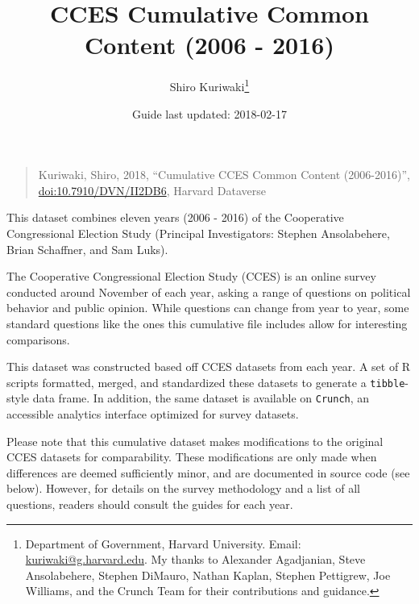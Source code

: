 \documentclass[10pt,article,oneside]{memoir}
\title{ \LARGE\textbf{CCES Cumulative Common Content (2006 - 2016)}}
\author{Shiro Kuriwaki\thanks{Department of Government, Harvard University. Email:
\url{kuriwaki@g.harvard.edu}. My thanks to Alexander Agadjanian, Steve
Ansolabehere, Stephen DiMauro, Nathan Kaplan, Stephen Pettigrew, Joe
Williams, and the Crunch Team for their contributions and guidance.}  }
\date{Guide last updated: 2018-02-17}
\theoremstyle{definition}
\begin{document}
\maketitle





\renewcommand\UrlFont{\color{crimson}\ttfamily}
















\begin{quote}
Kuriwaki, Shiro, 2018, ``Cumulative CCES Common Content (2006-2016)'',
\href{https://dataverse.harvard.edu/dataset.xhtml?persistentId=doi:10.7910/DVN/II2DB6}{\url{doi:10.7910/DVN/II2DB6}},
Harvard Dataverse
\end{quote}

\noindent This dataset combines eleven years (2006 - 2016) of the
Cooperative Congressional Election Study (Principal Investigators:
Stephen Ansolabehere, Brian Schaffner, and Sam Luks).

The Cooperative Congressional Election Study (CCES) is an online survey
conducted around November of each year, asking a range of questions on
political behavior and public opinion. While questions can change from
year to year, some standard questions like the ones this cumulative file
includes allow for interesting comparisons.

This dataset was constructed based off CCES datasets from each year. A
set of R scripts formatted, merged, and standardized these datasets to
generate a \texttt{tibble}-style data frame. In addition, the same
dataset is available on \texttt{Crunch}, an accessible analytics
interface optimized for survey datasets.

Please note that this cumulative dataset makes modifications to the
original CCES datasets for comparability. These modifications are only
made when differences are deemed sufficiently minor, and are documented
in source code (see below). However, for details on the survey
methodology and a list of all questions, readers should consult the
guides for each year.

\bigskip
\end{document}

